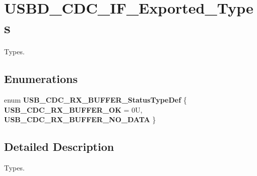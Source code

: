 \hypertarget{group__USBD__CDC__IF__Exported__Types}{}\section{U\+S\+B\+D\+\_\+\+C\+D\+C\+\_\+\+I\+F\+\_\+\+Exported\+\_\+\+Types}
\label{group__USBD__CDC__IF__Exported__Types}


Types.  


\subsection*{Enumerations}
\begin{DoxyCompactItemize}
\item 
\mbox{\label{group__USBD__CDC__IF__Exported__Types_gaaaac7e9bffb7ad4440ceda540759d08d}} 
enum {\bfseries U\+S\+B\+\_\+\+C\+D\+C\+\_\+\+R\+X\+\_\+\+B\+U\+F\+F\+E\+R\+\_\+\+Status\+Type\+Def} \{ {\bfseries U\+S\+B\+\_\+\+C\+D\+C\+\_\+\+R\+X\+\_\+\+B\+U\+F\+F\+E\+R\+\_\+\+OK} = 0U, 
{\bfseries U\+S\+B\+\_\+\+C\+D\+C\+\_\+\+R\+X\+\_\+\+B\+U\+F\+F\+E\+R\+\_\+\+N\+O\+\_\+\+D\+A\+TA}
 \}
\end{DoxyCompactItemize}


\subsection{Detailed Description}
Types. 

